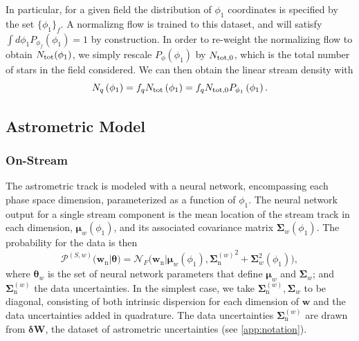 \documentclass[twocolumn]{aastex631}
\newcommand{\mrm}[1]{\mathrm{#1}}
\newcommand{\mbs}[1]{\boldsymbol{#1}}
\newcommand{\mbf}[1]{\mathbf{#1}}
\newcommand{\mcal}[1]{\mathcal{#1}}
\newcommand{\pdf}{\mcal{P}}
\newcommand{\nth}[1]{{#1}_{\mrm{n}}}  %
\newcommand{\smallcomponent}[2]{#2^{\scriptscriptstyle (#1)}}
\newcommand{\cmp}[2]{\smallcomponent{#1}{#2}}
\newcommand{\astroM}[1]{{#1}_w}
\begin{document}
        In particular, for a given field the distribution of $\phi_1$ coordinates is specified by the set $\{\phi_1\}_f$. A normalizng flow is trained to this dataset, and will satisfy $\int d\phi_1 P_{\phi_f}(\phi_1) = 1$ by construction. In order to re-weight the normalizing flow to obtain $N_{\rm tot}(\phi_1)$, we simply rescale $P_{\phi}(\phi_1)$ by $N_{\rm tot,0}$, which is the total number of stars in the field considered. We can then obtain the linear stream density with
        \begin{equation}
            N_q\left(\phi_1\right) = f_q N_{\rm tot} \left(\phi_1\right)  = f_q N_{\rm tot,0} P_{\phi_1}\left(\phi_1\right) .
        \end{equation}

    
        
    \subsection{Astrometric Model} \label{sub:astrometric_model}

        \subsubsection{On-Stream} \label{ssub:astrometric_model_on_stream}
    
            The astrometric track is modeled with a neural network, encompassing each phase space dimension, parameterized as a function of $\phi_1$. The neural network output for a single stream component is the mean location of the stream track in each dimension, $\astroM{\mbs{\mu}}(\phi_1)$, and its associated covariance matrix $\astroM{\mbs{\Sigma}}(\phi_1)$. The probability for the data is then
            \begin{equation}
                \cmp{S,w}{\pdf}(\nth{\mbs{w}} | \mbs{\theta}) \! = \mcal{N}_F \big(\nth{\mbs{w}} | \astroM{\mbs{\mu}}\!(\phi_1), {\cmp{w}{\nth{\mbs{\Sigma}}}}^2 \! + \!  \astroM{\mbs{\Sigma}}^2\!\left(\phi_1\right) \!\big),
            \end{equation}
            where $\astroM{\mbs{\theta}}$ is the set of neural network parameters that define $\astroM{\mbs{\mu}}$ and $\astroM{\mbs{\Sigma}}$; and $\cmp{w}{\nth{\mbs{\Sigma}}}$ the data uncertainties.
            In the simplest case, we take $\cmp{w}{\nth{\mbs{\Sigma}}}, \astroM{\mbs{\Sigma}}$ to be diagonal, consisting of both intrinsic dispersion for each dimension of $\mbs{w}$ and the data uncertainties added in quadrature. The data uncertainties $\cmp{w}{\nth{\mbs{\Sigma}}}$ are drawn from $\mbs{\delta}\mbf{W}$, the dataset of astrometric uncertainties (see \autoref{app:notation}).
\end{document}
